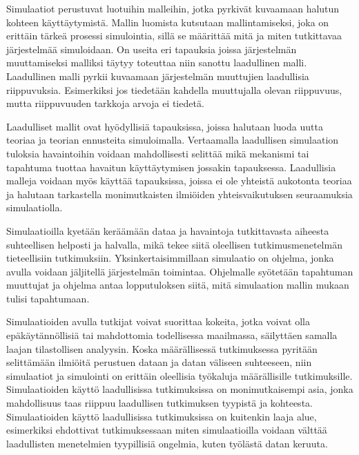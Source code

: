\documentclass[utf8]{gradu3}
\begin{document}
Simulaatiot perustuvat luotuihin malleihin, 
jotka pyrkivät kuvaamaan halutun kohteen käyttäytymistä. 
Mallin luomista kutsutaan mallintamiseksi, joka on erittäin tärkeä prosessi simulointia,
sillä se määrittää mitä ja miten tutkittavaa järjestelmää simuloidaan. 
On useita eri tapauksia joissa järjestelmän muuttamiseksi malliksi 
täytyy toteuttaa niin sanottu laadullinen malli. 
Laadullinen malli pyrkii kuvaamaan järjestelmän muuttujien laadullisia riippuvuksia.
Esimerkiksi jos tiedetään kahdella muuttujalla olevan riippuvuus, mutta riippuvuuden 
tarkkoja arvoja ei tiedetä.

Laadulliset mallit ovat hyödyllisiä tapauksissa, joissa halutaan luoda uutta teoriaa ja teorian ennusteita simuloimalla. Vertaamalla laadullisen simulaation tuloksia havaintoihin 
voidaan mahdollisesti selittää mikä mekanismi tai tapahtuma tuottaa havaitun käyttäytymisen jossakin tapauksessa.
Laadullisia malleja voidaan myös käyttää tapauksissa, joissa ei ole yhteistä aukotonta teoriaa ja halutaan tarkastella monimutkaisten ilmiöiden yhteisvaikutuksen seuraamuksia simulaatiolla.

Simulaatioilla kyetään keräämään dataa ja havaintoja tutkittavasta aiheesta suhteellisen helposti ja halvalla, mikä tekee siitä oleellisen tutkimusmenetelmän tieteellisiin tutkimuksiin. Yksinkertaisimmillaan simulaatio on ohjelma, jonka avulla voidaan jäljitellä järjestelmän toimintaa. Ohjelmalle syötetään tapahtuman muuttujat ja ohjelma antaa lopputuloksen siitä, mitä simulaation mallin mukaan tulisi tapahtumaan. 

Simulaatioiden avulla tutkijat voivat suorittaa kokeita, jotka voivat olla epäkäytännöllisiä tai mahdottomia todellisessa maailmassa, säilyttäen samalla laajan tilastollisen analyysin. Koska määrällisessä tutkimuksessa pyritään selittämään ilmiöitä perustuen dataan ja datan väliseen suhteeseen, niin simulaatiot ja simulointi on erittäin oleellisia työkaluja määrällisille tutkimuksille. 
Simulaatioiden käyttö laadullisissa tutkimuksissa on monimutkaisempi asia, 
jonka mahdollisuus taas riippuu laadullisen tutkimuksen tyypistä ja kohteesta. 
Simulaatioiden käyttö laadullisissa tutkimuksissa on kuitenkin laaja alue, 
esimerkiksi \textcite{eldabi2002quantitative} ehdottivat tutkimuksessaan miten simulaatioilla voidaan välttää laadullisten menetelmien tyypillisiä ongelmia, kuten työlästä datan keruuta. 
\end{document}
